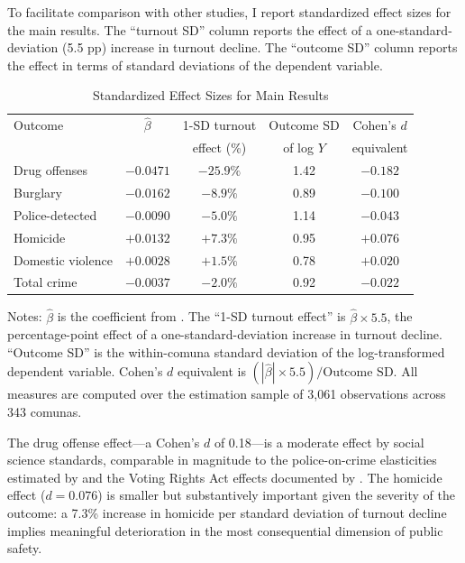 \documentclass[12pt]{article}
\begin{document}
To facilitate comparison with other studies, I report standardized effect sizes for the main results. The ``turnout SD'' column reports the effect of a one-standard-deviation (5.5 pp) increase in turnout decline. The ``outcome SD'' column reports the effect in terms of standard deviations of the dependent variable.

\begin{table}[H]
\centering
\caption{Standardized Effect Sizes for Main Results}
\begin{threeparttable}
\begin{tabular}{lcccc}
\toprule
Outcome & $\hat{\beta}$ & 1-SD turnout & Outcome SD & Cohen's $d$ \\
        &               & effect (\%)  & of log $Y$ & equivalent  \\
\midrule
Drug offenses   & $-0.0471$ & $-25.9\%$ & 1.42 & $-0.182$ \\
Burglary        & $-0.0162$ & $-8.9\%$  & 0.89 & $-0.100$ \\
Police-detected & $-0.0090$ & $-5.0\%$  & 1.14 & $-0.043$ \\
Homicide        & $+0.0132$ & $+7.3\%$  & 0.95 & $+0.076$ \\
Domestic violence & $+0.0028$ & $+1.5\%$ & 0.78 & $+0.020$ \\
Total crime     & $-0.0037$ & $-2.0\%$  & 0.92 & $-0.022$ \\
\bottomrule
\end{tabular}
\begin{tablenotes}[flushleft]
\small
\item Notes: $\hat{\beta}$ is the coefficient from . The ``1-SD turnout effect'' is $\hat{\beta} \times 5.5$, the percentage-point effect of a one-standard-deviation increase in turnout decline. ``Outcome SD'' is the within-comuna standard deviation of the log-transformed dependent variable. Cohen's $d$ equivalent is $(|\hat{\beta}| \times 5.5) / \text{Outcome SD}$. All measures are computed over the estimation sample of 3,061 observations across 343 comunas.
\end{tablenotes}
\end{threeparttable}
\label{tab:effect_sizes}
\end{table}

The drug offense effect---a Cohen's $d$ of 0.18---is a moderate effect by social science standards, comparable in magnitude to the police-on-crime elasticities estimated by \citet{Chalfin2018} and the Voting Rights Act effects documented by \citet{Cascio2014}. The homicide effect ($d = 0.076$) is smaller but substantively important given the severity of the outcome: a 7.3\% increase in homicide per standard deviation of turnout decline implies meaningful deterioration in the most consequential dimension of public safety.
\end{document}
